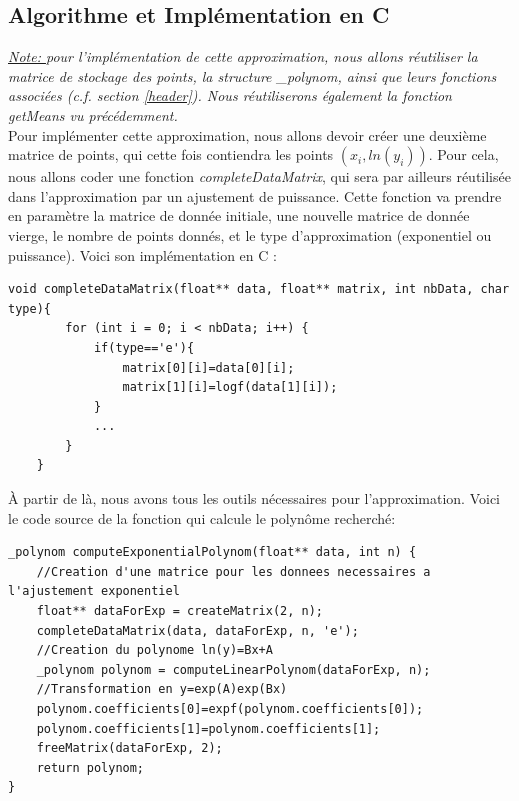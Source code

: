 \subsection{Algorithme et Implémentation en C}
\textit{\underline{Note: } pour l'implémentation de cette approximation, nous allons réutiliser la matrice de stockage des points, la structure \_polynom, ainsi que leurs fonctions associées (c.f. section \ref{header}). Nous réutiliserons également la fonction getMeans vu précédemment.}\vspace{5pt}\\
Pour implémenter cette approximation, nous allons devoir créer une deuxième matrice de points, qui cette fois contiendra les points $(x_i, ln(y_i))$. Pour cela, nous allons coder une fonction \textit{completeDataMatrix}, qui sera par ailleurs réutilisée dans l'approximation par un ajustement de puissance. Cette fonction va prendre en paramètre la matrice de donnée initiale, une nouvelle matrice de donnée vierge, le nombre de points donnés, et le type d'approximation (exponentiel ou puissance). Voici son implémentation en C :\\
\begin{lstlisting}[mathescape=true, basicstyle=\fontsize{8}{10}\selectfont, frame=single]
    void completeDataMatrix(float** data, float** matrix, int nbData, char type){
        for (int i = 0; i < nbData; i++) {
            if(type=='e'){
                matrix[0][i]=data[0][i];
                matrix[1][i]=logf(data[1][i]);
            }
            ...
        }
    }       
\end{lstlisting}
À partir de là, nous avons tous les outils nécessaires pour l'approximation. Voici le code source de la fonction qui calcule le polynôme recherché:\\
\begin{lstlisting}[mathescape=true, basicstyle=\fontsize{8}{10}\selectfont, frame=single]
_polynom computeExponentialPolynom(float** data, int n) {
    //Creation d'une matrice pour les donnees necessaires a l'ajustement exponentiel
    float** dataForExp = createMatrix(2, n);
    completeDataMatrix(data, dataForExp, n, 'e');
    //Creation du polynome ln(y)=Bx+A
    _polynom polynom = computeLinearPolynom(dataForExp, n);
    //Transformation en y=exp(A)exp(Bx)
    polynom.coefficients[0]=expf(polynom.coefficients[0]);
    polynom.coefficients[1]=polynom.coefficients[1];
    freeMatrix(dataForExp, 2);
    return polynom;
}
\end{lstlisting}
\newpage

